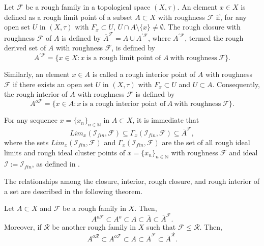 \documentclass[11pt]{amsart}
\begin{document}
\begin{definition}
 Let $\mathscr{F}$ be a rough family in a topological space $(X,\tau)$. An element $x\in X$ is defined as a rough limit point of a subset $A\subset X$ with roughness $\mathscr{F}$ if, for any open set $U$ in $(X,\tau)$ with $F_x\subset U$, $U\cap A\setminus\{x\}\neq \emptyset$. The rough closure with roughness $\mathscr{F}$ of $A$ is defined by 
$\overline{A}^\mathscr{F}=A\cup A^{'\mathscr{F}}$, where $A^{'\mathscr{F}}$, termed the rough derived set of $A$ with roughness $\mathscr{F}$, is defined by $$A^{'\mathscr{F}}=\{x\in X: x~ \text{is a rough limit point of }A~\text{with roughness}~\mathscr{F}\}.$$
  
    Similarly, an element $x\in A$ is called a rough interior point of $A$ with roughness $\mathscr{F}$ if there exists an open set $U$ in $(X,\tau)$ with $F_x\subset U$ and $U\subset A.$ Consequently, the rough interior of $A$ with roughness $\mathscr{F}$ is defined by 
    $$A^{o\mathscr{F}}=\{x\in A: x~\text{is a rough interior point of}~A~\text{with roughness}~\mathscr{F}\}.$$
\end{definition}


\begin{remark}
    For any sequence $x=\{x_n\}_{n\in\mathbb{N}}$ in $A\subset X$, it is immediate that $$Lim_x(\mathcal{I}_{fin}, \mathscr{F})\subseteq\Gamma_x(\mathcal{I}_{fin},\mathscr{F})\subseteq \overline{A}^\mathscr{F},$$ where the sets $Lim_x(\mathcal{I}_{fin}, \mathscr{F})$ and $\Gamma_x(\mathcal{I}_{fin},\mathscr{F})$ are the set of all rough ideal limits and rough ideal cluster points of $x=\{x_n\}_{n\in\mathbb{N}}$ with roughness $\mathscr{F}$ and ideal $\mathcal{I}:=\mathcal{I}_{fin}$, as defined in \cite{Leonetti2026}.
\end{remark}



The relationships among the closure, interior, rough closure, and rough interior of a set are described in the following theorem.

\begin{theorem}\label{T1} Let $A\subset X$ and $\mathscr{F}$ be a rough family in $X$. Then, $$A^{o\mathscr{F}}\subset A^{o}\subset A\subset \overline{A}\subset \overline{A}^\mathscr{F}.$$ Moreover, if $\mathscr{R}$ be another rough family in $X$ such that $\mathscr{F}\leq \mathscr{R}$. Then, $$A^{o\mathscr{R}}\subset A^{o\mathscr{F}} \subset A\subset \overline{A}^\mathscr{F}\subset \overline{A}^\mathscr{R}.$$ 

\end{theorem}
\end{document}
